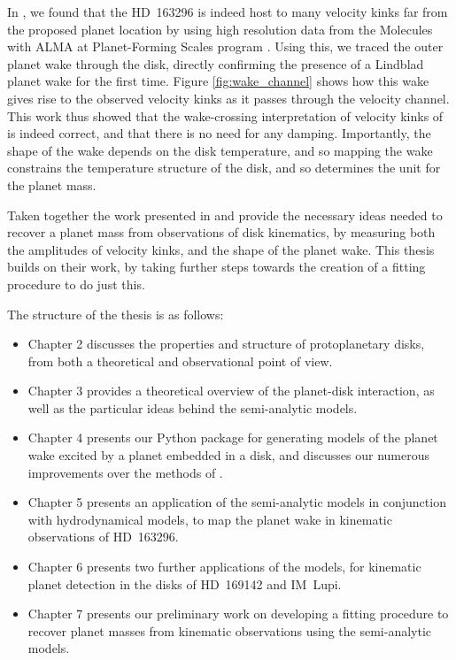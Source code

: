 In \citet{calcino2022}, we found that the HD~163296 is indeed host to many velocity kinks far from the proposed planet location by using high resolution data from the Molecules with ALMA at Planet-Forming Scales program \citep[MAPS;][]{oberg2021}.
Using this, we traced the outer planet wake through the disk, directly confirming the presence of a Lindblad planet wake for the first time.
Figure \ref{fig:wake_channel} shows how this wake gives rise to the observed velocity kinks as it passes through the velocity channel.
This work thus showed that the wake-crossing interpretation of velocity kinks of \citet{bollati2021a} is indeed correct, and that there is no need for any damping.
Importantly, the shape of the wake depends on the disk temperature, and so mapping the wake constrains the temperature structure of the disk, and so determines the unit for the planet mass.

Taken together the work presented in \citet{bollati2021a} and \citet{calcino2022} provide the necessary ideas needed to recover a planet mass from observations of disk kinematics, by measuring both the amplitudes of velocity kinks, and the shape of the planet wake.
This thesis builds on their work, by taking further steps towards the creation of a fitting procedure to do just this.

The structure of the thesis is as follows:
\begin{itemize}
    \item Chapter 2 discusses the properties and structure of protoplanetary disks, from both a theoretical and observational point of view.
    \item Chapter 3 provides a theoretical overview of the planet-disk interaction, as well as the particular ideas behind the semi-analytic models.
    \item Chapter 4 presents our Python package for generating models of the planet wake excited by a planet embedded in a disk, and discusses our numerous improvements over the methods of \citet{bollati2021a}.
    \item Chapter 5 presents an application of the semi-analytic models in conjunction with hydrodynamical models, to map the planet wake in kinematic observations of HD~163296.
    \item Chapter 6 presents two further applications of the models, for kinematic planet detection in the disks of HD~169142 and IM~Lupi.
    \item Chapter 7 presents our preliminary work on developing a fitting procedure to recover planet masses from kinematic observations using the semi-analytic models.
\end{itemize}

